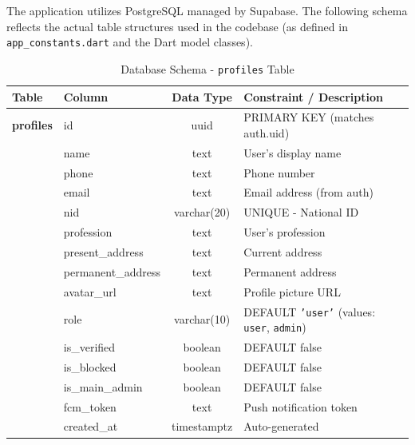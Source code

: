 \documentclass[12pt, a4paper, twoside, openany]{report}
\begin{document}
The application utilizes PostgreSQL managed by Supabase. The following schema reflects the actual table structures used in the codebase (as defined in \texttt{app\_constants.dart} and the Dart model classes).
\begin{table}[ht]
\centering
\caption{Database Schema - \texttt{profiles} Table}
\label{tab:profiles}
\begin{tabularx}{\textwidth}{p{3cm} p{3cm} c X}
\toprule
\textbf{Table} & \textbf{Column} & \textbf{Data Type} & \textbf{Constraint / Description} \\
\midrule
\textbf{profiles} & id & uuid & PRIMARY KEY (matches auth.uid) \\
& name & text & User's display name \\
& phone & text & Phone number \\
& email & text & Email address (from auth) \\
& nid & varchar(20) & UNIQUE - National ID \\
& profession & text & User's profession \\
& present\_address & text & Current address \\
& permanent\_address & text & Permanent address \\
& avatar\_url & text & Profile picture URL \\
& role & varchar(10) & DEFAULT \texttt{'user'} (values: \texttt{user}, \texttt{admin}) \\
& is\_verified & boolean & DEFAULT false \\
& is\_blocked & boolean & DEFAULT false \\
& is\_main\_admin & boolean & DEFAULT false \\
& fcm\_token & text & Push notification token \\
& created\_at & timestamptz & Auto-generated \\
\bottomrule
\end{tabularx}
\end{table}
\end{document}
